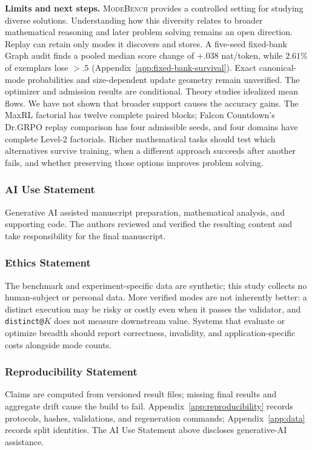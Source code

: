 \documentclass{article}
\newcommand{\1}{\mathbf 1}
\newcommand{\mb}{\textsc{ModeBench}}
\theoremstyle{remark}
\theoremstyle{definition}
\theoremstyle{plain}
\begin{document}
\textbf{Limits and next steps.} \mb{} provides a controlled setting for
studying diverse solutions. Understanding how this diversity relates to broader
mathematical reasoning and later problem solving remains an open direction. Replay can
retain only modes it discovers and stores. A five-seed fixed-bank Graph audit
finds a pooled median score change of $+.038$ nat/token, while $2.61\%$ of
exemplars lose $>.5$ (Appendix~\ref{app:fixed-bank-survival}). Exact canonical-mode
probabilities and size-dependent update geometry remain unverified. The optimizer and admission results are conditional. Theory studies idealized mean flows.
We have not shown that broader support
causes the accuracy gains. The MaxRL factorial has twelve complete paired
blocks; Falcon Countdown's Dr.GRPO replay comparison has four admissible seeds,
and four domains have complete Level-2 factorials. Richer mathematical tasks
should test which alternatives survive training, when a different approach
succeeds after another fails, and whether preserving those options improves
problem solving.

\clearpage
\subsubsection*{AI Use Statement}
\label{sec:ai-use}

Generative AI assisted manuscript preparation, mathematical analysis, and
supporting code. The authors reviewed and verified the resulting content and
take responsibility for the final manuscript.

\subsubsection*{Ethics Statement}

The benchmark and experiment-specific data are synthetic; this study collects
no human-subject or personal data. More verified modes are not inherently
better: a distinct execution may be risky or costly even when it passes the
validator, and \texttt{distinct@}$K$ does not measure downstream value. Systems
that evaluate or optimize breadth should report correctness, invalidity, and
application-specific costs alongside mode counts.

\subsubsection*{Reproducibility Statement}

Claims are computed from versioned result files; missing final results and aggregate drift cause the build to
fail. Appendix~\ref{app:reproducibility} records protocols, hashes, validations,
and regeneration commands; Appendix~\ref{app:data} records split identities.
The AI Use Statement above discloses generative-AI assistance.
\end{document}
